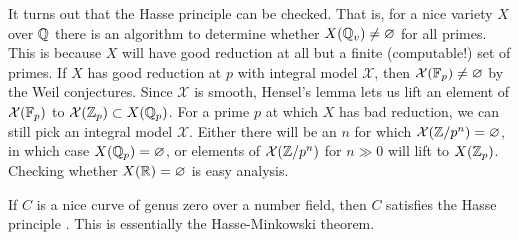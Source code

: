 \documentclass{article}
\begin{document}
It turns out that the Hasse principle can be checked. That is, for a nice 
variety $X$ over $\mathbb{Q}$ there is an algorithm to determine whether 
$X(\mathbb{Q}_v)\ne\varnothing$ for all primes. This is because $X$ will have good 
reduction at all but a finite (computable!) set of primes. If $X$ has good 
reduction at $p$ with integral model $\mathcal X$, then 
$\mathcal X(\mathbb{F}_p)\ne\varnothing$ by the Weil conjectures. Since $\mathcal X$ 
is smooth, Hensel's lemma lets us lift an element of $\mathcal X(\mathbb{F}_p)$ to 
$\mathcal X(\mathbb{Z}_p)\subset X(\mathbb{Q}_p)$. For a prime $p$ at 
which $X$ has bad reduction, we can still pick an integral model $\mathcal X$. 
Either there will be an $n$ for which $\mathcal X(\mathbb{Z}/p^n)=\varnothing$, in 
which case $X(\mathbb{Q}_p)=\varnothing$, or elements of $\mathcal X(\mathbb{Z}/p^n)$ for 
$n\gg 0$ will lift to $X(\mathbb{Z}_p)$. Checking whether $X(\mathbb{R})=\varnothing$ is easy 
analysis. 

If $C$ is a nice curve of genus zero over a number field, then $C$ satisfies 
the Hasse principle \cite[3.4]{ca67}. This is essentially the 
Hasse-Minkowski theorem. 
\end{document}
